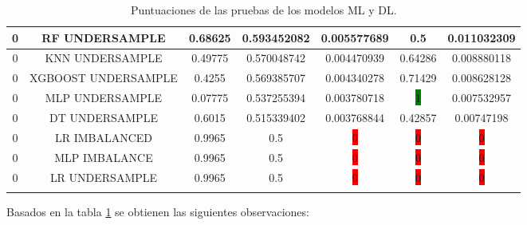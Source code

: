 \begin{longtable}{|c|c|c|c|c|c|c|}
  	0 & RF UNDERSAMPLE & 0.68625 & 0.593452082 & 0.005577689 & 0.5 & 0.011032309\\ \hline
  	0 & KNN UNDERSAMPLE & 0.49775 & 0.570048742 & 0.004470939 & 0.64286 & 0.008880118\\ \hline
  	0 & XGBOOST UNDERSAMPLE & 0.4255 & 0.569385707 & 0.004340278 & 0.71429 & 0.008628128\\ \hline
  	0 & MLP UNDERSAMPLE & 0.07775 & 0.537255394 & 0.003780718 & \colorbox{green}{1} & 0.007532957\\ \hline
  	0 & DT UNDERSAMPLE & 0.6015 & 0.515339402 & 0.003768844 & 0.42857 & 0.00747198\\ \hline
  	0 & LR IMBALANCED & 0.9965 & 0.5 & \colorbox{red}{0} & \colorbox{red}{0} & \colorbox{red}{0}\\ \hline
  	0 & MLP IMBALANCE & 0.9965 & 0.5 & \colorbox{red}{0} & \colorbox{red}{0} & \colorbox{red}{0}\\ \hline
  	0 & LR UNDERSAMPLE & 0.9965 & 0.5 & \colorbox{red}{0} & \colorbox{red}{0} & \colorbox{red}{0}\\ \hline
  	\caption{Puntuaciones de las pruebas de los modelos ML y DL.}
  	\label{t:25}
  \end{longtable}

Basados en la tabla \ref{t:25} se obtienen las siguientes observaciones:

